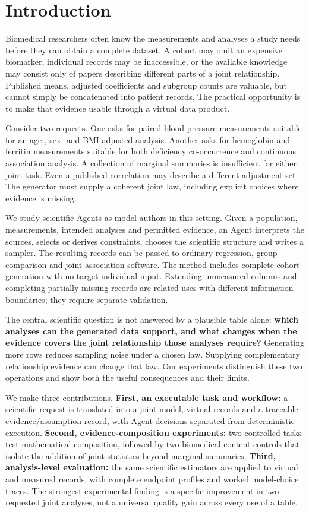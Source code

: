 \documentclass[11pt,letterpaper]{article}
\begin{document}
\section{Introduction}

Biomedical researchers often know the measurements and analyses a study needs before they can obtain a complete dataset. A cohort may omit an expensive biomarker, individual records may be inaccessible, or the available knowledge may consist only of papers describing different parts of a joint relationship. Published means, adjusted coefficients and subgroup counts are valuable, but cannot simply be concatenated into patient records. The practical opportunity is to make that evidence usable through a virtual data product.


Consider two requests. One asks for paired blood-pressure measurements suitable for an age-, sex- and BMI-adjusted analysis. Another asks for hemoglobin and ferritin measurements suitable for both deficiency co-occurrence and continuous association analysis. A collection of marginal summaries is insufficient for either joint task. Even a published correlation may describe a different adjustment set. The generator must supply a coherent joint law, including explicit choices where evidence is missing.


We study scientific Agents as model authors in this setting. Given a population, measurements, intended analyses and permitted evidence, an Agent interprets the sources, selects or derives constraints, chooses the scientific structure and writes a sampler. The resulting records can be passed to ordinary regression, group-comparison and joint-association software. The method includes complete cohort generation with no target individual input. Extending unmeasured columns and completing partially missing records are related uses with different information boundaries; they require separate validation.


The central scientific question is not answered by a plausible table alone: \textbf{which analyses can the generated data support, and what changes when the evidence covers the joint relationship those analyses require?} Generating more rows reduces sampling noise under a chosen law. Supplying complementary relationship evidence can change that law. Our experiments distinguish these two operations and show both the useful consequences and their limits.


We make three contributions. \textbf{First, an executable task and workflow:} a scientific request is translated into a joint model, virtual records and a traceable evidence/\allowbreak{}assumption record, with Agent decisions separated from deterministic execution. \textbf{Second, evidence-composition experiments:} two controlled tasks test mathematical composition, followed by two biomedical content controls that isolate the addition of joint statistics beyond marginal summaries. \textbf{Third, analysis-level evaluation:} the same scientific estimators are applied to virtual and measured records, with complete endpoint profiles and worked model-choice traces. The strongest experimental finding is a specific improvement in two requested joint analyses, not a universal quality gain across every use of a table.
\end{document}
